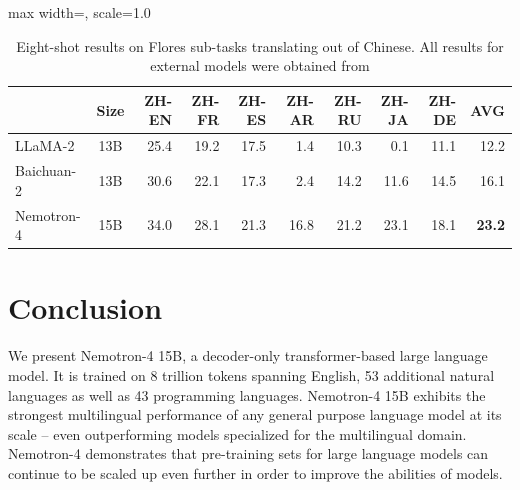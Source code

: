 \documentclass[11pt]{article}
\newcommand{\ours}{Nemotron-4}
\begin{document}
\begin{table}[H]
\centering
\begin{adjustbox}{max width=\textwidth, scale=1.0}
\begin{tabular}{lcrrrrrrrr}
\toprule
  & Size & ZH-EN & ZH-FR & ZH-ES & ZH-AR & ZH-RU & ZH-JA & ZH-DE & AVG  \\
\midrule
\multirow{1}{*}{LLaMA-2} 
& 13B & 25.4 &19.2 &17.5& 1.4& 10.3& 0.1 &11.1 &12.2  \\
\midrule
\multirow{1}{*}{Baichuan-2} 
& 13B & 30.6 & 22.1 & 17.3 & 2.4 & 14.2 & 11.6 & 14.5 & 16.1 \\
\midrule
\ours{} & 15B & 34.0 & 28.1 & 21.3 & 16.8 & 21.2 & 23.1 &	18.1 & \textbf{23.2} \\ 
\bottomrule
\end{tabular}
\end{adjustbox}
\caption{\label{tab:flores_ext} Eight-shot results on Flores sub-tasks translating out of Chinese. All results for external models were obtained from \citep{yang2023baichuan}}
\end{table}








\section{Conclusion}

We present \ours{} 15B, a decoder-only transformer-based large language model.
It is trained on 8 trillion tokens spanning English, 53 additional natural languages as well as 43 programming languages. \ours{} 15B exhibits the strongest multilingual performance of any general purpose language model at its scale -- even outperforming models specialized for the multilingual domain.
\ours{} demonstrates that pre-training sets for large language models can continue to be scaled up even further in order to improve the abilities of models. 


\end{document}
